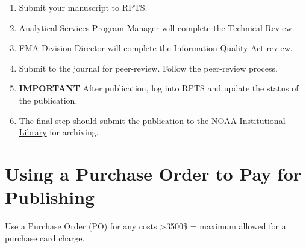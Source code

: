 \documentclass[
  letterpaper,
  DIV=11,
  numbers=noendperiod]{scrreprt}
\providecommand{\tightlist}{%
  \setlength{\itemsep}{0pt}\setlength{\parskip}{0pt}}\usepackage{longtable,booktabs,array}
\begin{document}
\begin{enumerate}
\def\labelenumi{\arabic{enumi}.}
\tightlist
\item
  Submit your manuscript to RPTS.\\
\item
  Analytical Services Program Manager will complete the Technical
  Review.\\
\item
  FMA Division Director will complete the Information Quality Act
  review.\\
\item
  Submit to the journal for peer-review. Follow the peer-review
  process.\\
\item
  \textbf{IMPORTANT} After publication, log into RPTS and update the
  status of the publication.\\
\item
  The final step should submit the publication to the
  \href{https://repository.library.noaa.gov/welcome}{NOAA Institutional
  Library} for archiving.
\end{enumerate}

\section{Using a Purchase Order to Pay for
Publishing}\label{using-a-purchase-order-to-pay-for-publishing}

Use a Purchase Order (PO) for any costs \textgreater3500\$ = maximum
allowed for a purchase card charge.
\end{document}
